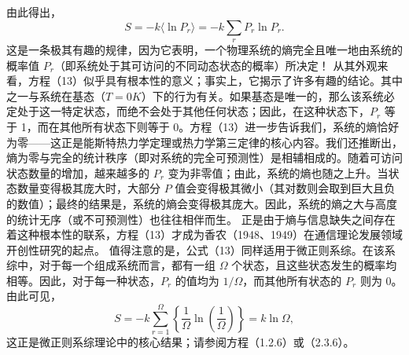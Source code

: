 由此得出，
\begin{equation}\tag{3.3.14}\label{eq:3.3.14}
S = - k \langle \ln P _ { r } \rangle = - k \sum _ { r } P _ { r } \ln P _ { r } .
\end{equation}
这是一条极其有趣的规律，因为它表明，一个物理系统的熵完全且唯一地由系统的概率值 \(P_{r}\)（即系统处于其可访问的不同动态状态的概率）所决定！
从其外观来看，方程（13）似乎具有根本性的意义；事实上，它揭示了许多有趣的结论。其中之一与系统在基态（\(T=0K\)）下的行为有关。如果基态是唯一的，那么该系统必定处于这一特定状态，而绝不会处于其他任何状态；因此，在这种状态下，\(P_r\) 等于 1，而在其他所有状态下则等于 0。方程（13）进一步告诉我们，系统的熵恰好为零——这正是能斯特热力学定理或热力学第三定律的核心内容。我们还推断出，熵为零与完全的统计秩序（即对系统的完全可预测性）是相辅相成的。随着可访问状态数量的增加，越来越多的 \(P_r\) 变为非零值；由此，系统的熵也随之上升。当状态数量变得极其庞大时，大部分 \(P\) 值会变得极其微小（其对数则会取到巨大且负的数值）；最终的结果是，系统的熵会变得极其庞大。因此，系统的熵之大与高度的统计无序（或不可预测性）也往往相伴而生。
正是由于熵与信息缺失之间存在着这种根本性的联系，方程（13）才成为香农（1948、1949）在通信理论发展领域开创性研究的起点。
值得注意的是，公式（13）同样适用于微正则系综。在该系综中，对于每一个组成系统而言，都有一组 \(\Omega\) 个状态，且这些状态发生的概率均相等。因此，对于每一种状态，\(P_{r}\) 的值均为 \(1/\Omega\)，而其他所有状态的 \(P_{r}\) 则为 0。由此可见，
\begin{equation}\tag{3.3.15}\label{eq:3.3.15}
S = - k \sum _ { r = 1 } ^{\Omega} \left\{ \frac { 1 } { \Omega } \ln \left( \frac { 1 } { \Omega } \right) \right\} = k \ln \Omega ,
\end{equation}
这正是微正则系综理论中的核心结果；请参阅方程（1.2.6）或（2.3.6）。

